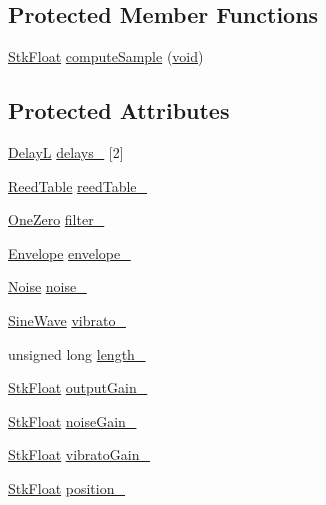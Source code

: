 \subsection*{Protected Member Functions}
\begin{DoxyCompactItemize}
\item 
\hyperlink{namespace_nyq_a044fa20a706520a617bbbf458a7db7e4}{Stk\+Float} \hyperlink{class_nyq_1_1_saxofony_aaa51bed120058cd1f7da72ee3b21d7d0}{compute\+Sample} (\hyperlink{sound_8c_ae35f5844602719cf66324f4de2a658b3}{void})
\end{DoxyCompactItemize}
\subsection*{Protected Attributes}
\begin{DoxyCompactItemize}
\item 
\hyperlink{class_nyq_1_1_delay_l}{DelayL} \hyperlink{class_nyq_1_1_saxofony_ab2cc0e0bbeb83d47ba685dafb9ff61ff}{delays\+\_\+} \mbox{[}2\mbox{]}
\item 
\hyperlink{class_nyq_1_1_reed_table}{Reed\+Table} \hyperlink{class_nyq_1_1_saxofony_ac8e0b9a3b78cc776843100c6f9084eab}{reed\+Table\+\_\+}
\item 
\hyperlink{class_nyq_1_1_one_zero}{One\+Zero} \hyperlink{class_nyq_1_1_saxofony_ae019d4be43b19210316312d00f6ae291}{filter\+\_\+}
\item 
\hyperlink{class_nyq_1_1_envelope}{Envelope} \hyperlink{class_nyq_1_1_saxofony_a444660f4df369a5df97f7ccb03fb9178}{envelope\+\_\+}
\item 
\hyperlink{class_nyq_1_1_noise}{Noise} \hyperlink{class_nyq_1_1_saxofony_ace6ceb3b855a5b4b24e78cc2196db73c}{noise\+\_\+}
\item 
\hyperlink{class_nyq_1_1_sine_wave}{Sine\+Wave} \hyperlink{class_nyq_1_1_saxofony_a370943ad93126d91ef7e5c108b8a09bb}{vibrato\+\_\+}
\item 
unsigned long \hyperlink{class_nyq_1_1_saxofony_a2c2aad28530ae146acd0b0baf7998ba8}{length\+\_\+}
\item 
\hyperlink{namespace_nyq_a044fa20a706520a617bbbf458a7db7e4}{Stk\+Float} \hyperlink{class_nyq_1_1_saxofony_ac49ab8742a96f308cb30576b4162454a}{output\+Gain\+\_\+}
\item 
\hyperlink{namespace_nyq_a044fa20a706520a617bbbf458a7db7e4}{Stk\+Float} \hyperlink{class_nyq_1_1_saxofony_a25fde81d813d1d6e283387f5e988cf7f}{noise\+Gain\+\_\+}
\item 
\hyperlink{namespace_nyq_a044fa20a706520a617bbbf458a7db7e4}{Stk\+Float} \hyperlink{class_nyq_1_1_saxofony_a64b9bde97127b3de724ad9c2e18f33ff}{vibrato\+Gain\+\_\+}
\item 
\hyperlink{namespace_nyq_a044fa20a706520a617bbbf458a7db7e4}{Stk\+Float} \hyperlink{class_nyq_1_1_saxofony_af740e6a53310d5e8be80a75324ffcaea}{position\+\_\+}
\end{DoxyCompactItemize}
